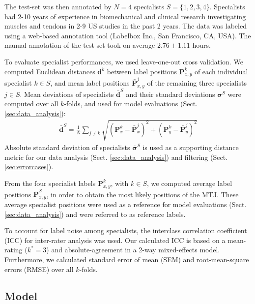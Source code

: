 \documentclass[journal,twoside,web]{ieeecolor}
\begin{document}
The test-set was then annotated by $N = 4$ specialists $S = \{1, 2, 3, 4\}$. Specialists had 2-10 years of experience in biomechanical and clinical research investigating muscles and tendons in 2-9 US studies in the past 2 years. 
The data was labeled using a web-based annotation tool (Labelbox Inc., San Francisco, CA, USA). The manual annotation of the test-set took on average $2.76 \pm1.11$ hours. 

To evaluate specialist performances, we used leave-one-out cross validation. We computed Euclidean distances $\boldsymbol{d}^{k}$ between label positions $\boldsymbol{P}^{k}_{x,y}$ of each individual specialist $k \in S$, and mean label positions $\bar{\boldsymbol{P}}^{j}_{x,y}$ of the remaining three specialists $j \in S$. 
Mean deviations of specialists $\bar{\boldsymbol{d}}^{S}$ and their standard deviations $\boldsymbol{\sigma}^{S}$ were computed over all $k$-folds, and used for model evaluations (Sect. \ref{sec:data_analysis}):
\begin{equation}
\label{eq:sp_mean}
    \begin{gathered}
        \bar{\boldsymbol{d}}^{S} = \frac{1}{N} \sum_{j\neq k} \sqrt{(\boldsymbol{P}^{k}_{x} - \bar{\boldsymbol{P}}^{j}_{x})^2+(\boldsymbol{P}^{k}_{y} - \bar{\boldsymbol{P}}^{j}_{y})^2}
    \end{gathered}
\end{equation}
Absolute standard deviation of specialists $\bar{\boldsymbol{\sigma}}^{S}$ is used as a supporting distance metric for our data analysis (Sect. \ref{sec:data_analysis}) and filtering (Sect. \ref{sec:errorcases}). 

From the four specialist labels $\boldsymbol{P}^{k}_{x,y}$, with $k \in S$, we computed average label positions $\bar{\boldsymbol{P}}^{S}_{x,y}$, in order to obtain the most likely positions of the MTJ. These average specialist positions were used as a reference for model evaluations (Sect. \ref{sec:data_analysis}) and were referred to as reference labels. 

To account for label noise among specialists, the interclass correlation coefficient (ICC) for inter-rater analysis was used. Our calculated ICC is based on a mean-rating ($k^{*} = 3$) and absolute-agreement in a 2-way mixed-effects model. Furthermore, we calculated standard error of mean (SEM) and root-mean-square errors (RMSE) over all $k$-folds.



\subsection{Model}
\label{sec:methods.model}
\end{document}
